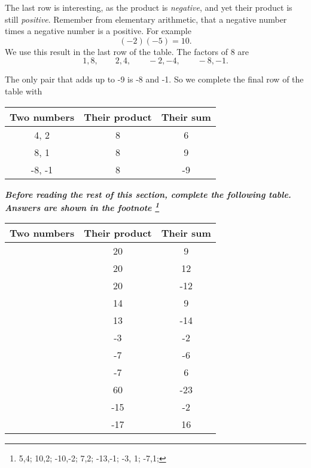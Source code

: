 The last row is interesting, as the product is {\em negative}, and yet their product is still {\em positive}. Remember
from elementary arithmetic, that a negative number times a negative number is a positive. For example
\[
	(-2)(-5)=10.
\]
We use this result in the last row of the table. The factors of 8 are 
\[
	1, 8, \qquad 2,4,	\qquad -2, -4, \qquad -8, -1.
\]

The only pair that adds up to -9 is -8 and -1. So we complete the final row of the table with
\begin{center}
	\begin{tabular}{cSS}
		\toprule
        Two numbers           & {Their product} & {Their sum} \\
		\midrule
		{\color{blue}4, 2}    & 8           & 6       \\
		{\color{blue}8, 1}    & 8           & 9       \\
		{\color{blue}-8, -1 } & 8           & -9      \\
		\bottomrule
	\end{tabular}
\end{center}

{\bfseries\itshape Before reading the rest of this section, complete the following table. Answers
	are shown in the footnote \footnote{5,4; 10,2; -10,-2; 7,2; -13,-1; -3, 1; -7,1; }}
\begin{center}
	\begin{tabular}{cSS}
		\toprule
		Two numbers & {Their product} & {Their sum} \\
		\midrule
		            & 20              & 9           \\
		            & 20              & 12          \\	
		            & 20              & -12         \\	
		            & 14              & 9           \\
		            & 13              & -14         \\	
		            & -3              & -2          \\	
		            & -7              & -6          \\	
		            & -7              & 6           \\	
		            & 60              & -23         \\	
		            & -15             & -2          \\	
		            & -17             & 16          \\	
		\bottomrule
	\end{tabular}
\end{center}

